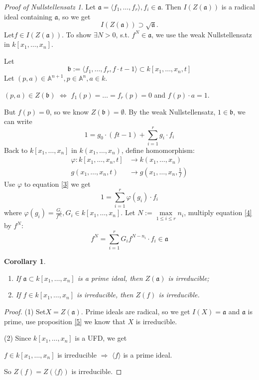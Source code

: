 \documentclass{amsart}
\theoremstyle{plain}
\newtheorem{corollary}{Corollary}
\theoremstyle{definition}
\theoremstyle{remark}
\newtheorem*{proofofnullstellensatz}{Proof of Nullstellensatz}
\numberwithin{equation}{section}
\begin{document}
\begin{proofofnullstellensatz}
	Let $ \mathfrak{a} = \langle f_1,\dots, f_r\rangle, f_i\in \mathfrak{a} $. Then $ I(Z(\mathfrak{a}))  $ is a radical ideal containing $ \mathfrak{a} $, so we get
	$$
	I(Z(\mathfrak{a}))\supset \sqrt{\mathfrak{a}}.
	$$
	Let$ f\in I(Z(\mathfrak{a})) $. To show $ \exists N>0 $, s.t. $ f^N\in \mathfrak{a} $, we use the weak Nullstellensatz in $ k[x_1,\dots,x_n] $. 
	
	Let
	\begin{equation}
	\mathfrak{b}:=\langle f_1,\dots,f_r,f\cdot t -1\rangle\subset k[x_1,\dots,x_n,t]
	\end{equation}
	Let $ (p,a)\in \mathbb{A}^{n+1}, p\in \mathbb{A}^n, a\in k $.
	\begin{center}
		$ (p,a)\in Z(\mathfrak{b}) $ $ \Leftrightarrow $ $ f_1(p)=\dots=f_r(p)=0 $ and $ f(p)\cdot a=1 $.
	\end{center}
	But $ f(p)=0 $, so we know $ Z(\mathfrak{b})=\emptyset $. By the weak Nullstellensatz, $ 1\in \mathfrak{b} $, we can write
	\begin{equation}
	1=g_0\cdot (ft-1)+\sum\limits_{i=1}^{r}g_i\cdot f_i\label{3}
	\end{equation}
	Back to $ k[x_1,\dots,x_n] $ in $ k(x_1,\dots,x_n) $, define homomorphism:
\begin{align*}
\varphi: k[x_1,\dots,x_n,t]&\to k(x_1,\dots,x_n)\\
g(x_1,\dots,x_n,t)&\to g(x_1,\dots,x_n,\frac{1}{f})
\end{align*}
Use $ \varphi $ to equation \ref{3} we get
\begin{equation}
1=\sum\limits_{i=1}^{r}\varphi (g_i)\cdot f_i\label{4}
\end{equation}
where $ \varphi(g_i)=\frac{G_i}{f^{n_i}},G_i\in k[x_1,\dots,x_n] $. Let $ N:=\max\limits_{1\leq i\leq r}n_i $, multiply equation \ref{4} by $ f^N $:
\begin{equation}
f^N=\sum\limits_{i=1}^{r}G_if^{N-n_i}\cdot f_i\in \mathfrak{a}
\end{equation}
\end{proofofnullstellensatz}
\begin{corollary}
	\begin{enumerate}
		\item If $ \mathfrak{a}\subset k[x_1,\dots,x_n] $ is a prime ideal, then $ Z(\mathfrak{a}) $ is irreducible;
		\item If $ f\in k[x_1,\dots,x_n] $ is irreducible, then $ Z(f) $ is irreducible.
	\end{enumerate}
\end{corollary}
\begin{proof}
	(1) Set$ X=Z(\mathfrak{a}) $. Prime ideals are radical, so we get $ I(X)=\mathfrak{a} $ and $ \mathfrak{a} $ is prime, use proposition \ref{5} we know that $ X $ is irreducible.
	
	(2) Since $ k[x_1,\dots,x_n] $ is a UFD, we get 
	\begin{center}
		$ f\in k[x_1,\dots,x_n] $ is irreducible $ \Rightarrow $ $ \langle f\rangle $ is a prime ideal.
	\end{center}
	So $ Z(f)=Z(\langle f\rangle) $ is irreducible.
\end{proof}
\end{document}
